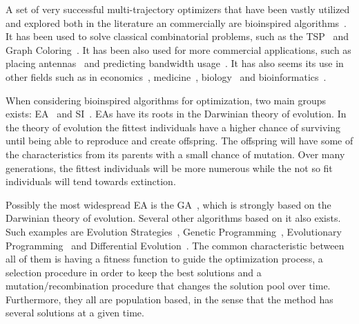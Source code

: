A set of very successful multi-trajectory optimizers that have been vastly utilized and explored both in the literature an commercially are bioinspired algorithms~\cite{olariu2005handbook}. It has been used to solve classical combinatorial problems, such as the 
\ac{TSP}~\cite{chatterjee1996genetic} and Graph Coloring~\cite{costa1995embedding}.
It has been also used for more commercial applications, such as placing
antennas~\cite{calegari1997parallel} and predicting bandwidth
usage~\cite{swaminathan1999bandwidth}. It has also seems its use in other fields
such as in economics~\cite{li1996economic}, medicine~\cite{wehrens1993hips},
biology~\cite{cotta2002inferring} and bioinformatics~\cite{cotta2009metaheuristics}.

When considering bioinspired algorithms for optimization, two main groups exists: \ac{EA}~\cite{back1996evolutionary} and \ac{SI}~\cite{mavrovouniotis2017survey}. \ac{EA}s have its roots in the Darwinian theory of evolution. In the theory of evolution the fittest individuals have a higher chance of surviving until being able to reproduce and create offspring. The offspring will have some of the characteristics from its parents with a small chance of mutation. Over many
generations, the fittest individuals will be more numerous while the not so fit individuals will tend towards extinction.

Possibly the most widespread \ac{EA} is the \ac{GA}~\cite{holland1992genetic},
which is strongly based on the Darwinian theory of evolution. Several other
algorithms based on it also exists. Such examples are
Evolution Strategies~\cite{michalewicz1996evolution},
Genetic Programming~\cite{koza1992genetic},
Evolutionary Programming~\cite{yao1996fast} and
Differential Evolution~\cite{storn1997differential}. The common characteristic
between all of them is having a fitness function to guide the optimization process,
a selection procedure in order to keep the best solutions and a mutation/recombination
procedure that changes the solution pool over time. Furthermore, they all are population
based, in the sense that the method has several solutions at a given time.


